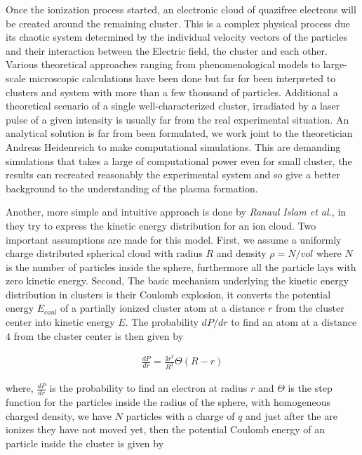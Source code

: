 Once the ionization process started, an electronic cloud of quazifree electrons will be created around the remaining cluster. This is a complex physical process due its chaotic system determined by the individual velocity vectors of the particles and their interaction between the Electric field, the cluster and each other. Various theoretical approaches ranging from phenomenological models \cite{ditmire_interaction_1996} to large-scale microscopic calculations \cite{saalmann_mechanisms_2006} have been done but far for been interpreted to clusters and system with more than a few thousand of particles. Additional a  theoretical scenario of a single well-characterized cluster, irradiated by a laser pulse of a given intensity is usually far from the real experimental situation. An analytical solution is far from been formulated, we work joint to the theoretician Andreas Heidenreich to make computational simulations. This are demanding simulations that takes a large of computational power even for small cluster, the results can recreated reasonably the experimental system and so give a better background to the understanding of the plasma formation.

Another, more simple and intuitive approach is done by  \textit{Ranaul Islam et al.}, in \cite{islam_kinetic_2006} they try to express the kinetic energy distribution for an ion cloud. Two important assumptions are made for this model. First, we assume a uniformly charge distributed spherical cloud with radius $R$ and density $\rho=N/vol$ where $N$ is the number of particles inside the sphere, furthermore all the particle lays with zero kinetic energy. Second, The basic mechanism underlying the kinetic energy distribution in clusters is their Coulomb explosion, it converts the potential energy $E_{coul}$ of a partially ionized cluster atom at a distance $r$ from the cluster center into kinetic energy $E$. The probability $dP/dr$ to find an atom at a distance $4$ from the cluster center is then given by\cite{islam_kinetic_2006}

\begin{align}
\frac{dP}{dr}=\frac{3 r^2}{R^3} \Theta (R-r)
\label{density_distribution}
\end{align}

where, $\frac{dP}{dr}$ is the probability to find an electron at radius $r$ and $\Theta$ is the step function for the particles inside the radius of the sphere, with homogeneous charged density, we have $N$ particles with a charge of $q$ and just after the are ionizes they have not moved yet, then the potential Coulomb energy of an particle inside the cluster is given by

